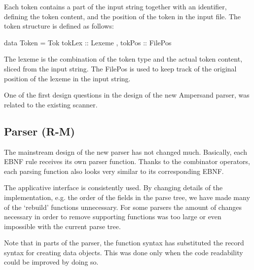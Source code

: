 Each token contains a part of the input string together with an identifier, defining the token content, and the position of the token in the input file.
The token structure is defined as follows:

data Token = Tok {	  tokLex :: Lexeme
                		, tokPos :: FilePos }

The lexeme is the combination of the token type and the actual token content, sliced from the input string.
The FilePos is used to keep track of the original position of the lexeme in the input string.


One of the first design questions in the design of the new Ampersand parser, was related to the existing scanner.

\subsection{Parser (R-M)}
\label{subsec:design-parser}
The mainstream design of the new parser has not changed much.
Basically, each EBNF rule receives its own parser function.
Thanks to the combinator operators, each parsing function also looks very similar to its corresponding EBNF.

The applicative interface is consistently used.
By changing details of the implementation, e.g. the order of the fields in the parse tree, we have made many of the `rebuild' functions unnecessary.
For some parsers the amount of changes necessary in order to remove supporting functions was too large or even impossible with the current parse tree.

Note that in parts of the parser, the function syntax has substituted the record syntax for creating data objects.
This was done only when the code readability could be improved by doing so.

